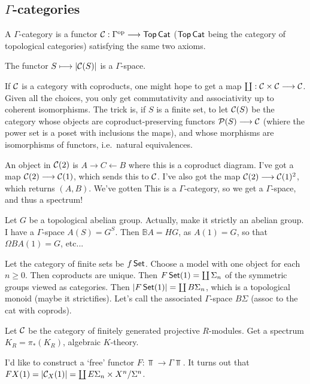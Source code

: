 \documentclass[11pt]{article}
\begin{document}
\begin{JandrGammaPractice}
\subsection*{$\Gamma$-categories}
A $\Gamma$-category is a functor $\mathcal{C}:\Gamma^{\textup{op}}\longrightarrow\operatorname{{\mathsf{Top}}}\operatorname{{\mathsf{Cat}}}$ ($\operatorname{{\mathsf{Top}}}\operatorname{{\mathsf{Cat}}}$ being the category of topological categories) satisfying the same two axioms.
\begin{cor*}
The functor $S\longmapsto|\mathcal{C}(S)|$ is a $\Gamma$-space.
\end{cor*}
If $\mathcal{C}$ is a category with coproducts, one might hope to get a map $\coprod:\mathcal{C}\times\mathcal{C}\longrightarrow\mathcal{C}$. Given all the choices, you only get commutativity and associativity up to coherent isomorphisms. The trick is, if $S$ is a finite set, to let $\mathcal{C}(S)$ be the category whose objects are coproduct-preserving functors $\mathcal{P}(S)\longrightarrow\mathcal{C}$ (whiere the power set is a poset with inclusions the maps), and whose morphisms are isomorphisms of functors, i.e.\ natural equivalences.

An object in $\mathcal{C}(2)$ is $A\rightarrow C\leftarrow B$ where this is a coproduct diagram. I've got a map $\mathcal{C}(2)\longrightarrow \mathcal{C}(1)$, which sends this to $\mathcal{C}$. I've also got the map $\mathcal{C}(2)\longrightarrow\mathcal{C}(1)^2$, which returns $(A,B)$. We've gotten
This is a $\Gamma$-category, so we get a $\Gamma$-space, and thus a spectrum!
\begin{exmp*}
Let $G$ be a topological abelian group. Actually, make it strictly an abelian group. I have a $\Gamma$-space $A(S)=G^S$. Then $\mathbb{B}A=HG$, as $A(1)=G$, so that $\Omega BA(1)=G$, etc...
\end{exmp*}
\begin{exmp*}
Let the category of finite sets be $f\operatorname{{\mathsf{Set}}}$.
Choose a model with one object for each $n\geq0$. Then coproducts are unique. Then $F\operatorname{{\mathsf{Set}}}(1)=\coprod\Sigma_n$ of the symmetric groups viewed as categories. Then $|F\operatorname{{\mathsf{Set}}}(1)|=\coprod  B\Sigma_n$, which is a topological monoid (maybe it strictifies). Let's call the associated $\Gamma$-space $B\Sigma$ (assoc to the cat with coprods). 
\end{exmp*}
\begin{exmp*}
Let $\mathcal{C}$ be the category of finitely generated projective $R$-modules. Get a spectrum $K_R=\pi_*(K_R)$, algebraic $K$-theory.
\end{exmp*}
I'd like to construct a `free' functor $F:\Top\to\Gamma\Top$. It turns out that $FX(1)=|\mathcal{C}_X(1)|=\coprod E\Sigma_n\times X^n/\Sigma^n$.


\end{JandrGammaPractice}
\end{document}
